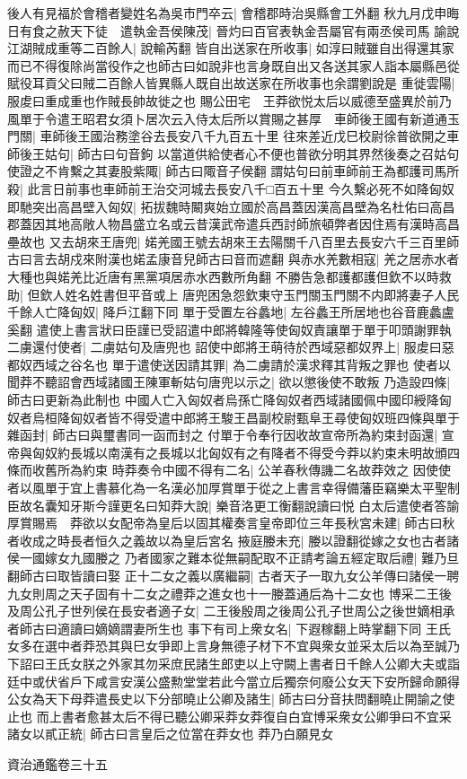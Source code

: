 後人有見福於會稽者變姓名為吳市門卒云|{
	會稽郡時治吳縣會工外翻}
秋九月戊申晦日有食之赦天下徒　遣執金吾侯陳茂|{
	晉灼曰百官表執金吾屬官有兩丞侯司馬}
諭說江湖賊成重等二百餘人|{
	說輸芮翻}
皆自出送家在所收事|{
	如淳曰賊雖自出得還其家而已不得復除尚當役作之也師古曰如說非也言身既自出又各送其家人詣本屬縣邑從賦役耳貢父曰賊二百餘人皆異縣人既自出故送家在所收事也余謂劉說是}
重徙雲陽|{
	服䖍曰重成重也作賊長帥故徙之也}
賜公田宅　王莽欲悦太后以威德至盛異於前乃風單于令遣王昭君女須卜居次云入侍太后所以賞賜之甚厚　車師後王國有新道通玉門關|{
	車師後王國治務塗谷去長安八千九百五十里}
往來差近戊巳校尉徐普欲開之車師後王姑句|{
	師古曰句音鉤}
以當道供給使者心不便也普欲分明其界然後奏之召姑句使證之不肯繫之其妻股紫陬|{
	師古曰陬音子侯翻}
謂姑句曰前車師前王為都護司馬所殺|{
	此言日前事也車師前王治交河城去長安八千□百五十里}
今久繫必死不如降匈奴即馳突出高昌壁入匈奴|{
	拓拔魏時闞爽始立國於高昌蓋因漢高昌壁為名杜佑曰高昌郡蓋因其地高敞人物昌盛立名或云昔漢武帝遣兵西討師旅頓弊者因住焉有漢時高昌壘故也}
又去胡來王唐兜|{
	婼羌國王號去胡來王去陽關千八百里去長安六千三百里師古曰言去胡戍來附漢也婼孟康音兒師古曰音而遮翻}
與赤水羌數相寇|{
	羌之居赤水者大種也與婼羌比近唐有黑黨項居赤水西數所角翻}
不勝告急都護都護但欽不以時救助|{
	但欽人姓名姓書但平音或上}
唐兜困急怨欽東守玉門關玉門關不内即將妻子人民千餘人亡降匈奴|{
	降戶江翻下同}
單于受置左谷蠡地|{
	左谷蠡王所居地也谷音鹿蠡盧奚翻}
遣使上書言狀曰臣謹已受詔遣中郎將韓隆等使匈奴責讓單于單于叩頭謝罪執二虜還付使者|{
	二虜姑句及唐兜也}
詔使中郎將王萌待於西域惡都奴界上|{
	服䖍曰惡都奴西域之谷名也}
單于遣使送因請其罪|{
	為二虜請於漢求釋其背叛之罪也}
使者以聞莽不聽詔會西域諸國王陳軍斬姑句唐兜以示之|{
	欲以懲後使不敢叛}
乃造設四條|{
	師古曰更新為此制也}
中國人亡入匈奴者烏孫亡降匈奴者西域諸國佩中國印綬降匈奴者烏桓降匈奴者皆不得受遣中郎將王駿王昌副校尉甄阜王尋使匈奴班四條與單于雜函封|{
	師古曰與璽書同一函而封之}
付單于令奉行因收故宣帝所為約束封函還|{
	宣帝與匈奴約長城以南漢有之長城以北匈奴有之有降者不得受今莽以約束未明故頒四條而收舊所為約束}
時莽奏令中國不得有二名|{
	公羊春秋傳譏二名故莽效之}
因使使者以風單于宜上書慕化為一名漢必加厚賞單于從之上書言幸得備藩臣竊樂太平聖制臣故名囊知牙斯今謹更名曰知莽大說|{
	樂音洛更工衡翻說讀曰悦}
白太后遣使者答諭厚賞賜焉　莽欲以女配帝為皇后以固其權奏言皇帝即位三年長秋宮未建|{
	師古曰秋者收成之時長者恒久之義故以為皇后宮名}
掖庭媵未充|{
	媵以證翻從嫁之女也古者諸侯一國嫁女九國媵之}
乃者國家之難本從無嗣配取不正請考論五經定取后禮|{
	難乃旦翻師古曰取皆讀曰娶}
正十二女之義以廣繼嗣|{
	古者天子一取九女公羊傳曰諸侯一聘九女則周之天子固有十二女之禮莽之進女也十一媵蓋通后為十二女也}
博采二王後及周公孔子世列侯在長安者適子女|{
	二王後殷周之後周公孔子世周公之後世嫡相承者師古曰適讀曰嫡嫡謂妻所生也}
事下有司上衆女名|{
	下遐稼翻上時掌翻下同}
王氏女多在選中者莽恐其與巳女爭即上言身無德子材下不宜與衆女並采太后以為至誠乃下詔曰王氏女朕之外家其勿采庶民諸生郎吏以上守闕上書者日千餘人公卿大夫或詣廷中或伏省戶下咸言安漢公盛勲堂堂若此今當立后獨奈何廢公女天下安所歸命願得公女為天下母莽遣長史以下分部曉止公卿及諸生|{
	師古曰分音扶問翻曉止開諭之使止也}
而上書者愈甚太后不得已聽公卿采莽女莽復自白宜博采衆女公卿爭曰不宜采諸女以貳正統|{
	師古曰言皇后之位當在莽女也}
莽乃白願見女

資治通鑑卷三十五
